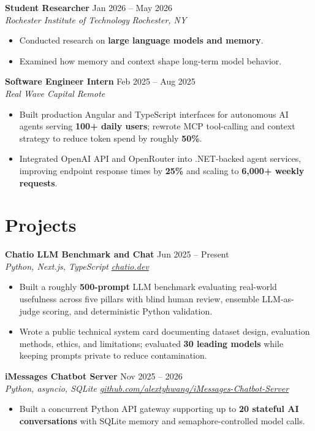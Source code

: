 \documentclass[10pt,letterpaper]{article}
\newif\ifresumeFirstRole
\newcommand{\resumeRole}[4]{%
  \ifresumeFirstRole
    \global\resumeFirstRolefalse
  \else
    \vspace{0pt plus 1fill}%
  \fi
  \textbf{#1} \hfill #2\\
  \textit{#3} \hfill \textit{#4}
}
\begin{document}
\resumeRole{Student Researcher}{Jan 2026 -- May 2026}{Rochester Institute of Technology}{Rochester, NY}
\begin{itemize}
  \item Conducted research on \textbf{large language models and memory}.
  \item Examined how memory and context shape long-term model behavior.
\end{itemize}

\resumeRole{Software Engineer Intern}{Feb 2025 -- Aug 2025}{Real Wave Capital}{Remote}
\begin{itemize}
  \item Built production Angular and TypeScript interfaces for autonomous AI agents serving \textbf{100+ daily users}; rewrote MCP tool-calling and context strategy to reduce token spend by roughly \textbf{50\%}.
  \item Integrated OpenAI API and OpenRouter into .NET-backed agent services, improving endpoint response times by \textbf{25\%} and scaling to \textbf{6,000+ weekly requests}.
\end{itemize}

\section*{Projects}
\resumeRole{Chatio LLM Benchmark and Chat}{Jun 2025 -- Present}{Python, Next.js, TypeScript}{\href{https://chatio.dev}{chatio.dev}}
\begin{itemize}
  \item Built a roughly \textbf{500-prompt} LLM benchmark evaluating real-world usefulness across five pillars with blind human review, ensemble LLM-as-judge scoring, and deterministic Python validation.
  \item Wrote a public technical system card documenting dataset design, evaluation methods, ethics, and limitations; evaluated \textbf{30 leading models} while keeping prompts private to reduce contamination.
\end{itemize}

\resumeRole{iMessages Chatbot Server}{Nov 2025 -- 2026}{Python, asyncio, SQLite}{\href{https://github.com/alextyhwang/iMessages-Chatbot-Server}{github.com/alextyhwang/iMessages-Chatbot-Server}}
\begin{itemize}
  \item Built a concurrent Python API gateway supporting up to \textbf{20 stateful AI conversations} with SQLite memory and semaphore-controlled model calls.
\end{itemize}
\end{document}
